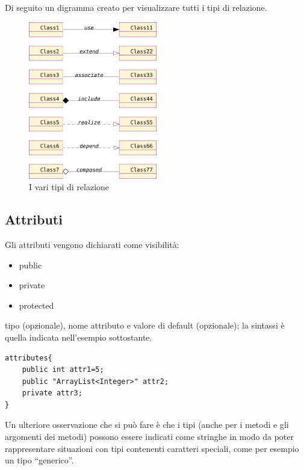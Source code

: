 Di seguito un digramma creato per visualizzare tutti i tipi di relazione.

\begin{figure}[htp]
\begin{center}
  \includegraphics[width=0.5\textwidth]{img/relation_arrow}
  \caption[labelInTOC]{I vari tipi di relazione}
\end{center}
\end{figure}


\subsection{Attributi}

Gli attributi vengono dichiarati come visibilità:
\begin{itemize}
  \item public
  \item private
  \item protected
\end{itemize}

tipo (opzionale), nome attributo e valore di default (opzionale); la sintassi è
quella indicata nell'esempio sottostante.

\begin{lstlisting}[caption={Dichiarazione di attributi}, style={model}]
attributes{
	public int attr1=5;
	public "ArrayList<Integer>" attr2;
	private attr3;
}
\end{lstlisting}

Un ulteriore osservazione che si può fare è che i tipi (anche per i metodi e gli 
argomenti dei metodi) possono essere indicati come stringhe in modo da poter 
rappresentare situazioni con tipi contenenti caratteri speciali, come per esempio
un tipo ``generico''.

